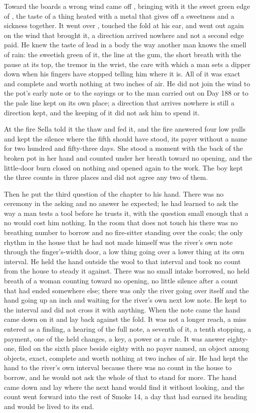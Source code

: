 Toward the boards a wrong wind came off , bringing with it the sweet green edge of , the taste of a thing heated with a metal that gives off a sweetness and a sickness together. It went over , touched the fold at his ear, and went out again on the wind that brought it, a direction arrived nowhere and not a second edge paid. He knew the taste of lead in a body the way another man knows the smell of rain: the sweetish green of it, the line at the gum, the short breath with the pause at its top, the tremor in the wrist, the care with which a man sets a dipper down when his fingers have stopped telling him where it is. All of it was exact and complete and worth nothing at two inches of air. He did not join the wind to the pot's early note or to the sayings or to the man carried out on Day 188 or to the pale line kept on its own place; a direction that arrives nowhere is still a direction kept, and the keeping of it did not ask him to spend it.

At the fire Sella told it the thaw and fed it, and the fire answered four low pulls and kept the silence where the fifth should have stood, its payer without a name for two hundred and fifty-three days. She stood a moment with the back of the broken pot in her hand and counted under her breath toward no opening, and the little-door burn closed on nothing and opened again to the work. The boy kept the three counts in three places and did not agree any two of them.

Then he put the third question of the chapter to his hand. There was no ceremony in the asking and no answer he expected; he had learned to ask the way a man tests a tool before he trusts it, with the question small enough that a no would cost him nothing. In the room that does not touch his there was no breathing number to borrow and no fire-sitter standing over the coals; the only rhythm in the house that he had not made himself was the river's own note through the finger's-width door, a low thing going over a lower thing at its own interval. He held the hand outside the wool to that interval and took no count from the house to steady it against. There was no small intake borrowed, no held breath of a woman counting toward no opening, no little silence after a count that had ended somewhere else; there was only the river going over itself and the hand going up an inch and waiting for the river's own next low note. He kept to the interval and did not cross it with anything. When the note came the hand came down on it and lay back against the fold. It was not a longer reach, a miss entered as a finding, a hearing of the full note, a seventh of it, a tenth stopping, a payment, one of the held changes, a key, a power or a rule. It was answer eighty-one, filed on the sixth place beside eighty with no payer named, an object among objects, exact, complete and worth nothing at two inches of air. He had kept the hand to the river's own interval because there was no count in the house to borrow, and he would not ask the whole of that to stand for more. The hand came down and lay where the next hand would find it without looking, and the count went forward into the rest of Smoke 14, a day that had earned its heading and would be lived to its end.
